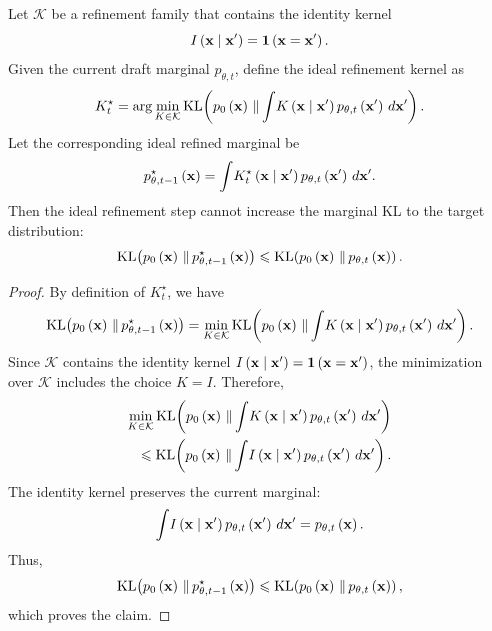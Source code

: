 \begin{proposition}
\label{prop:ideal_monotonicity}
Let $\mathcal{K}$ be a refinement family that contains the identity kernel
\begin{equation*}
    I\left(\mathbf{x}\mid\mathbf{x}'\right)=\mathbf{1}\left(\mathbf{x}=\mathbf{x}'\right).
\end{equation*}
Given the current draft marginal $p_{\theta,t}$, define the ideal refinement kernel as
\begin{equation*}
    K_t^\star
    =
    \arg\min_{K\in\mathcal{K}}
    \operatorname{KL}\!\left(
        p_0\left(\mathbf{x}\right)
        \,\|\,
        {\int}
        K\left(\mathbf{x}\mid\mathbf{x}'\right)
        p_{\theta,t}\left(\mathbf{x}'\right)
        \,d\mathbf{x}'
    \right).
\end{equation*}
Let the corresponding ideal refined marginal be
\begin{equation*}
    p_{\theta,t-1}^{\star}\left(\mathbf{x}\right)
    =
    {\int}
    K_t^\star\left(\mathbf{x}\mid\mathbf{x}'\right)
    p_{\theta,t}\left(\mathbf{x}'\right)
    \,d\mathbf{x}'.
\end{equation*}
Then the ideal refinement step cannot increase the marginal KL to the target distribution:
\begin{equation*}
    \operatorname{KL}\!\left(
        p_0\left(\mathbf{x}\right)
        \,\|\,
        p_{\theta,t-1}^{\star}\left(\mathbf{x}\right)
    \right)
    \leqslant
    \operatorname{KL}\!\left(
        p_0\left(\mathbf{x}\right)
        \,\|\,
        p_{\theta,t}\left(\mathbf{x}\right)
    \right).
\end{equation*}
\end{proposition}

\begin{proof}
By definition of $K_t^\star$, we have
\begin{align*}
    \operatorname{KL}\!\left(
        p_0\left(\mathbf{x}\right)
        \,\|\,
        p_{\theta,t-1}^{\star}\left(\mathbf{x}\right)
    \right) \nonumber 
    =
    \min_{K\in\mathcal{K}}
    \operatorname{KL}\!\left(
        p_0\left(\mathbf{x}\right)
        \,\|\,
        {\int}
        K\left(\mathbf{x}\mid\mathbf{x}'\right)
        p_{\theta,t}\left(\mathbf{x}'\right)
        \,d\mathbf{x}'
    \right).
\end{align*}
Since $\mathcal{K}$ contains the identity kernel $I\left(\mathbf{x}\mid\mathbf{x}'\right)=\mathbf{1}\left(\mathbf{x}=\mathbf{x}'\right)$, the minimization over $\mathcal{K}$ includes the choice $K=I$. 
Therefore,
\begin{align*}
    \min_{K\in\mathcal{K}}
    \operatorname{KL}\!\left(
        p_0\left(\mathbf{x}\right)
        \,\|\,
        {\int}
        K\left(\mathbf{x}\mid\mathbf{x}'\right)
        p_{\theta,t}\left(\mathbf{x}'\right)
        \,d\mathbf{x}'
    \right) \nonumber \\
   \leqslant
    \operatorname{KL}\!\left(
        p_0\left(\mathbf{x}\right)
        \,\|\,
        {\int}
        I\left(\mathbf{x}\mid\mathbf{x}'\right)
        p_{\theta,t}\left(\mathbf{x}'\right)
        \,d\mathbf{x}'
    \right).
\end{align*}
The identity kernel preserves the current marginal:
\begin{equation*}
    {\int}
    I\left(\mathbf{x}\mid\mathbf{x}'\right)
    p_{\theta,t}\left(\mathbf{x}'\right)
    \,d\mathbf{x}'
    =
    p_{\theta,t}\left(\mathbf{x}\right).
\end{equation*}
Thus,
\begin{equation*}
    \operatorname{KL}\!\left(
        p_0\left(\mathbf{x}\right)
        \,\|\,
        p_{\theta,t-1}^{\star}\left(\mathbf{x}\right)
    \right)
    \leqslant
    \operatorname{KL}\!\left(
        p_0\left(\mathbf{x}\right)
        \,\|\,
        p_{\theta,t}\left(\mathbf{x}\right)
    \right),
\end{equation*}
which proves the claim.
\end{proof}


